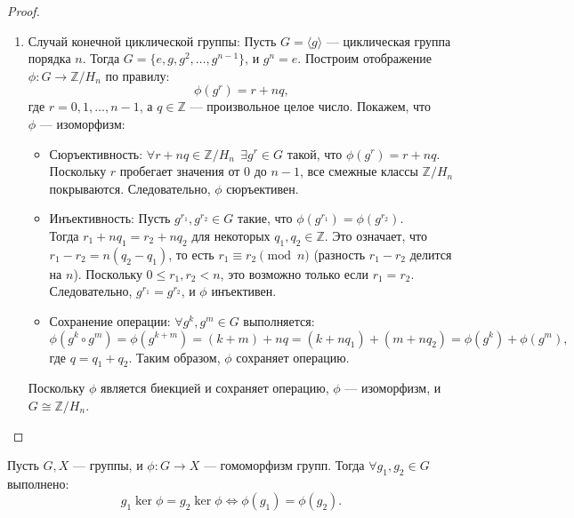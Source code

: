 \begin{proof}
\begin{enumerate}
        \item Случай конечной циклической группы:
              Пусть \( G = \langle g \rangle \) — циклическая группа порядка \( n \). Тогда \( G = \{ e, g, g^2, \dots, g^{n-1} \} \), и \( g^n = e \). Построим отображение \( \phi: G \to \mathbb{Z} / H_n \) по правилу:
              \[
              \phi(g^r) = r + nq,
              \]
              где \( r = 0, 1, \dots, n-1 \), а \( q \in \mathbb{Z} \) — произвольное целое число. Покажем, что \\\( \phi \) — изоморфизм:

              \begin{itemize}
                  \item Сюръективность:
                        \(\forall r + nq \in \mathbb{Z} / H_n \,\; \exists g^r \in G \) такой, что \( \phi(g^r) = r + nq \). Поскольку \( r \) пробегает значения от \( 0 \) до \( n-1 \), все смежные классы \( \mathbb{Z} / H_n \) покрываются. Следовательно, \( \phi \) сюръективен.

                  \item Инъективность:
                        Пусть \( g^{r_1}, g^{r_2} \in G \) такие, что \( \phi(g^{r_1}) = \phi(g^{r_2}) \). \\Тогда \( r_1 + nq_1 = r_2 + nq_2 \) для некоторых \( q_1, q_2 \in \mathbb{Z} \). Это означает, что \( r_1 - r_2 = n(q_2 - q_1) \), то есть \( r_1 \equiv r_2 \pmod{n} \) (разность \( r_1 - r_2 \) делится на \( n \)). Поскольку \( 0 \leq r_1, r_2 < n \), это возможно только если \( r_1 = r_2 \). Следовательно, \( g^{r_1} = g^{r_2} \), и \( \phi \) инъективен.

                  \item Сохранение операции:
                        \(\forall g^k, g^m \in G \) выполняется:
                        \[
                        \phi(g^k \circ g^m) = \phi(g^{k + m}) = (k + m) + nq = (k + nq_1) + (m + nq_2) = \phi(g^k) + \phi(g^m),
                        \]
                        где \( q = q_1 + q_2 \). Таким образом, \( \phi \) сохраняет операцию.
              \end{itemize}

              Поскольку \( \phi \) является биекцией и сохраняет операцию, \( \phi \) — изоморфизм, и \( G \cong \mathbb{Z} / H_n \).
    \end{enumerate}
\end{proof}

\begin{shlem}
    \begin{lemma}
        Пусть \( G, X \) — группы, и \( \phi: G \to X \) — гомоморфизм групп. Тогда \(\forall g_1, g_2 \in G \) выполнено:
        \[
        g_1 \ker \phi = g_2 \ker \phi \iff \phi(g_1) = \phi(g_2).
        \]
    \end{lemma}
\end{shlem}

